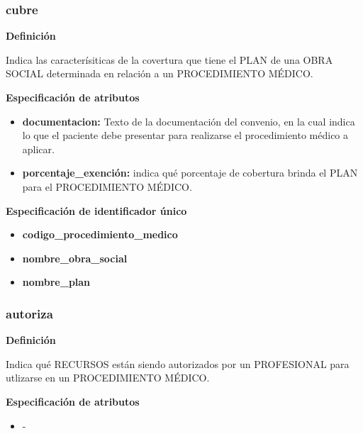 \documentclass[a4paper,11pt]{article}
\begin{document}
\subsubsection{\textbf{cubre}}

\textbf{Definición}

Indica las caracterísiticas de la covertura que tiene el PLAN de una 
OBRA SOCIAL determinada en relación a un PROCEDIMIENTO MÉDICO.

\textbf{Especificación de atributos}

\begin{itemize}

     \item \textbf{documentacion:} Texto de la documentación del convenio, en la cual 
     indica lo que el paciente debe presentar para realizarse el procedimiento médico 
     a aplicar.

     \item \textbf{porcentaje\_exención:} indica qué porcentaje de cobertura brinda
     el PLAN para el PROCEDIMIENTO MÉDICO.
	 
\end{itemize}

\textbf{Especificación de identificador único}

\begin{itemize}

     \item \textbf{codigo\_procedimiento\_medico}

     \item \textbf{nombre\_obra\_social}
     
     \item \textbf{nombre\_plan}

\end{itemize}

\subsubsection{\textbf{autoriza}}

\textbf{Definición}

Indica qué RECURSOS están siendo autorizados por un PROFESIONAL para utlizarse en 
un PROCEDIMIENTO MÉDICO.

\textbf{Especificación de atributos}

\begin{itemize}

    \item -

\end{itemize}
\end{document}

